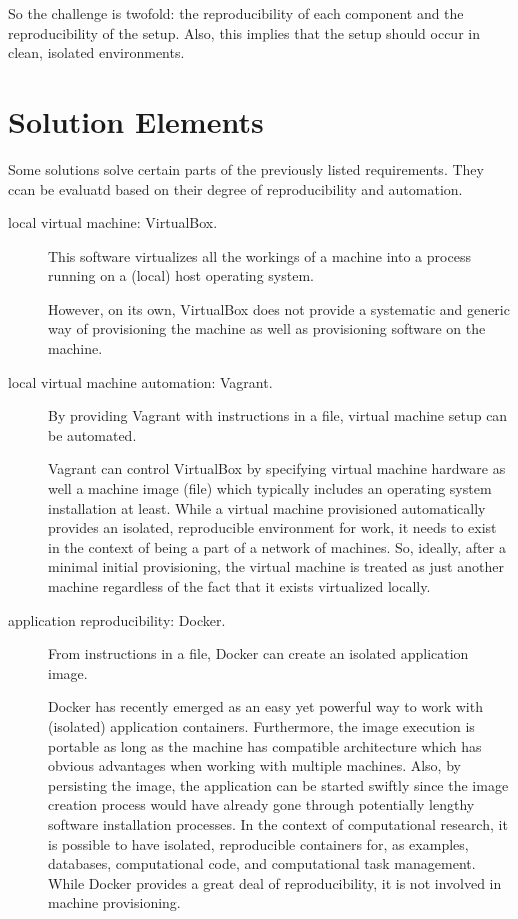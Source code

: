 So the challenge is twofold: the reproducibility of each component and the reproducibility of the setup.
%
Also, this implies that the setup should occur in clean, isolated environments.


\section{Solution Elements}


Some solutions solve certain parts of the previously listed requirements.
%
They ccan be evaluatd based on their degree of reproducibility and automation.


\begin{description}


\item[local virtual machine: \textsf{VirtualBox}.]
  This software virtualizes all the workings of a machine into a process running on a (local) host operating system.

  
  However, on its own, \textsf{VirtualBox} does not provide a systematic and generic way of provisioning the machine as well as provisioning software on the machine.


\item[local virtual machine automation: \textsf{Vagrant}.]
  By providing \textsf{Vagrant} with instructions in a file, virtual machine setup can be automated.
  

  \textsf{Vagrant} can control \textsf{VirtualBox} by specifying virtual machine hardware as well a machine image (file) which typically includes an operating system installation at least.
  While a virtual machine provisioned automatically provides an isolated, reproducible environment for work, it needs to exist in the context of being a part of a network of machines.
  So, ideally, after a minimal initial provisioning, the virtual machine is treated as just another machine regardless of the fact that it exists virtualized locally.


\item[application reproducibility: \textsf{Docker}.]
  From instructions in a file, \textsf{Docker} can create an isolated application image.


  \textsf{Docker} has recently emerged as an easy yet powerful way to work with (isolated) application containers.
  Furthermore, the image execution is portable as long as the machine has compatible architecture which has obvious advantages when working with multiple machines.
  Also, by persisting the image, the application can be started swiftly since the image creation process would have already gone through potentially lengthy software installation processes.
%
  In the context of computational research, it is possible to have isolated, reproducible containers for, as examples, databases, computational code, and computational task management.
  While \textsf{Docker} provides a great deal of reproducibility, it is not involved in machine provisioning.




\end{description}

